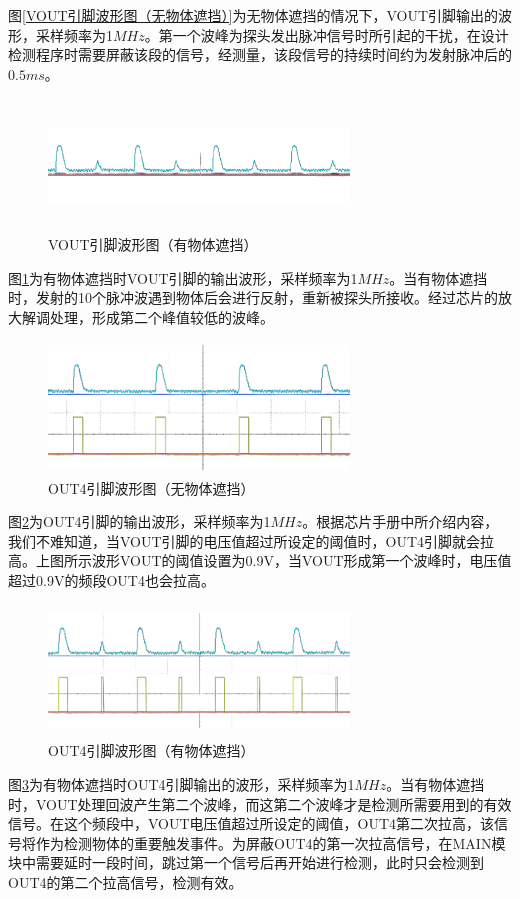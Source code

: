 图\ref{VOUT引脚波形图（无物体遮挡）}为无物体遮挡的情况下，VOUT引脚输出的波形，采样频率为1$MHz$。第一个波峰为探头发出脉冲信号时所引起的干扰，在设计检测程序时需要屏蔽该段的信号，经测量，该段信号的持续时间约为发射脉冲后的$0.5ms$。
\begin{figure}[!h]
	\centering
	\includegraphics[width=8cm,height=3.5cm]{figure/debug waveform6.png}
	\caption{VOUT引脚波形图（有物体遮挡）}
	\label{VOUT引脚波形图（有物体遮挡）}
\end{figure}\par
图\ref{VOUT引脚波形图（有物体遮挡）}为有物体遮挡时VOUT引脚的输出波形，采样频率为1$MHz$。当有物体遮挡时，发射的10个脉冲波遇到物体后会进行反射，重新被探头所接收。经过芯片的放大解调处理，形成第二个峰值较低的波峰。
\begin{figure}[!h]
	\centering
	\includegraphics[width=8cm,height=3.5cm]{figure/debug waveform7.png}
	\caption{OUT4引脚波形图（无物体遮挡）}
	\label{OUT4引脚波形图（无物体遮挡）}
\end{figure}\par
图\ref{OUT4引脚波形图（无物体遮挡）}为OUT4引脚的输出波形，采样频率为1$MHz$。根据芯片手册中所介绍内容，我们不难知道，当VOUT引脚的电压值超过所设定的阈值时，OUT4引脚就会拉高。上图所示波形VOUT的阈值设置为0.9V，当VOUT形成第一个波峰时，电压值超过0.9V的频段OUT4也会拉高。
\newpage
\begin{figure}[!h]
	\centering
	\includegraphics[width=8cm,height=3.5cm]{figure/debug wave form8.png}
	\caption{OUT4引脚波形图（有物体遮挡）}
	\label{OUT4引脚波形图（有物体遮挡）}
\end{figure}\par
图\ref{OUT4引脚波形图（有物体遮挡）}为有物体遮挡时OUT4引脚输出的波形，采样频率为1$MHz$。当有物体遮挡时，VOUT处理回波产生第二个波峰，而这第二个波峰才是检测所需要用到的有效信号。在这个频段中，VOUT电压值超过所设定的阈值，OUT4第二次拉高，该信号将作为检测物体的重要触发事件。为屏蔽OUT4的第一次拉高信号，在MAIN模块中需要延时一段时间，跳过第一个信号后再开始进行检测，此时只会检测到OUT4的第二个拉高信号，检测有效。



